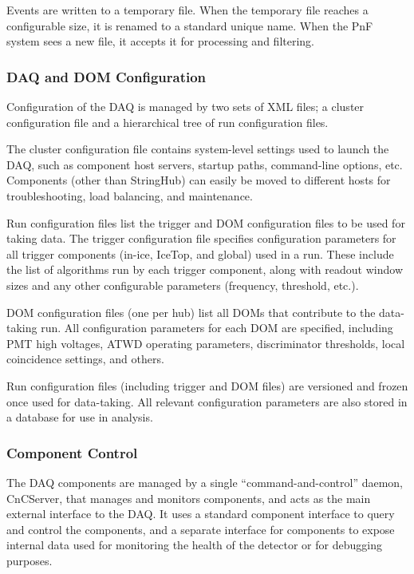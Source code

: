 Events are written to a temporary file.  When the temporary file reaches a
configurable size, it is renamed to a standard unique name.  When the PnF
system sees a new file, it accepts it for processing and filtering.

\subsubsection{DAQ and DOM Configuration}

Configuration of the DAQ is managed by two sets of XML files; a cluster
configuration file and a hierarchical tree of run configuration files.

The cluster configuration file contains system-level settings used to
launch the DAQ, such as component host servers, startup paths, command-line
options, etc.  Components (other than StringHub) can easily be moved to
different hosts for troubleshooting, load balancing, and maintenance.

Run configuration files list the trigger and DOM configuration files to be
used for taking data.  The trigger configuration file specifies
configuration parameters for all 
trigger components (in-ice, IceTop, and global) used in a run.  These
include the list of algorithms run by each trigger component, along with
readout window sizes and any other configurable parameters (frequency,
threshold, etc.).

DOM configuration files (one per hub) list all DOMs that contribute to
the data-taking run.  All configuration parameters for each DOM are
specified, including PMT high voltages, ATWD operating parameters,
discriminator thresholds, local coincidence settings, and others.

Run configuration files (including trigger and DOM files) are versioned and
frozen once used for data-taking.  All relevant configuration parameters
are also stored in a database for use in analysis.

\subsubsection{Component Control}

The DAQ components are managed by a single ``command-and-control'' daemon,
CnCServer, that manages and monitors components, and acts as the main
external interface to the DAQ.  It uses a standard component interface to query and
control the components, and a separate interface for components to expose
internal data used for monitoring the health of the detector or for
debugging purposes.


